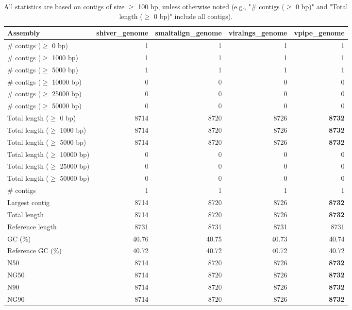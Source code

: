 \documentclass[12pt,a4paper]{article}
\begin{document}
\begin{table}[ht]
\begin{center}
\caption{All statistics are based on contigs of size $\geq$ 100 bp, unless otherwise noted (e.g., "\# contigs ($\geq$ 0 bp)" and "Total length ($\geq$ 0 bp)" include all contigs).}
\begin{tabular}{|l*{4}{|r}|}
\hline
Assembly & shiver\_genome & smaltalign\_genome & viralngs\_genome & vpipe\_genome \\ \hline
\# contigs ($\geq$ 0 bp) & 1 & 1 & 1 & 1 \\ \hline
\# contigs ($\geq$ 1000 bp) & 1 & 1 & 1 & 1 \\ \hline
\# contigs ($\geq$ 5000 bp) & 1 & 1 & 1 & 1 \\ \hline
\# contigs ($\geq$ 10000 bp) & 0 & 0 & 0 & 0 \\ \hline
\# contigs ($\geq$ 25000 bp) & 0 & 0 & 0 & 0 \\ \hline
\# contigs ($\geq$ 50000 bp) & 0 & 0 & 0 & 0 \\ \hline
Total length ($\geq$ 0 bp) & 8714 & 8720 & 8726 & {\bf 8732} \\ \hline
Total length ($\geq$ 1000 bp) & 8714 & 8720 & 8726 & {\bf 8732} \\ \hline
Total length ($\geq$ 5000 bp) & 8714 & 8720 & 8726 & {\bf 8732} \\ \hline
Total length ($\geq$ 10000 bp) & 0 & 0 & 0 & 0 \\ \hline
Total length ($\geq$ 25000 bp) & 0 & 0 & 0 & 0 \\ \hline
Total length ($\geq$ 50000 bp) & 0 & 0 & 0 & 0 \\ \hline
\# contigs & 1 & 1 & 1 & 1 \\ \hline
Largest contig & 8714 & 8720 & 8726 & {\bf 8732} \\ \hline
Total length & 8714 & 8720 & 8726 & {\bf 8732} \\ \hline
Reference length & 8731 & 8731 & 8731 & 8731 \\ \hline
GC (\%) & 40.76 & 40.75 & 40.73 & 40.74 \\ \hline
Reference GC (\%) & 40.72 & 40.72 & 40.72 & 40.72 \\ \hline
N50 & 8714 & 8720 & 8726 & {\bf 8732} \\ \hline
NG50 & 8714 & 8720 & 8726 & {\bf 8732} \\ \hline
N90 & 8714 & 8720 & 8726 & {\bf 8732} \\ \hline
NG90 & 8714 & 8720 & 8726 & {\bf 8732} \\ \hline

\end{tabular}
\end{center}
\end{table}
\end{document}

